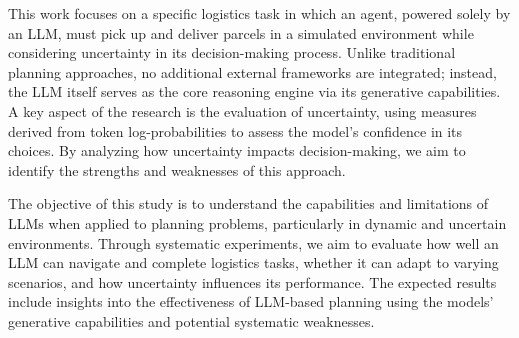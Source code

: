 This work focuses on a specific logistics task in which an agent, powered solely
by an LLM, must pick up and deliver parcels in a simulated environment while
considering uncertainty in its decision-making process. Unlike traditional planning
approaches, no additional external frameworks are integrated; instead, the LLM
itself serves as the core reasoning engine via its generative capabilities. A key
aspect of the research is the evaluation of uncertainty, using measures derived
from token log-probabilities to assess the model's confidence in its choices. By
analyzing how uncertainty impacts decision-making, we aim to identify the
strengths and weaknesses of this approach.

The objective of this study is to understand the capabilities and limitations of
LLMs when applied to planning problems, particularly in dynamic and uncertain environments.
Through systematic experiments, we aim to evaluate how well an LLM can navigate and
complete logistics tasks, whether it can adapt to varying scenarios, and how uncertainty
influences its performance. The expected results include insights into the
effectiveness of LLM-based planning using the models' generative capabilities and
potential systematic weaknesses.

